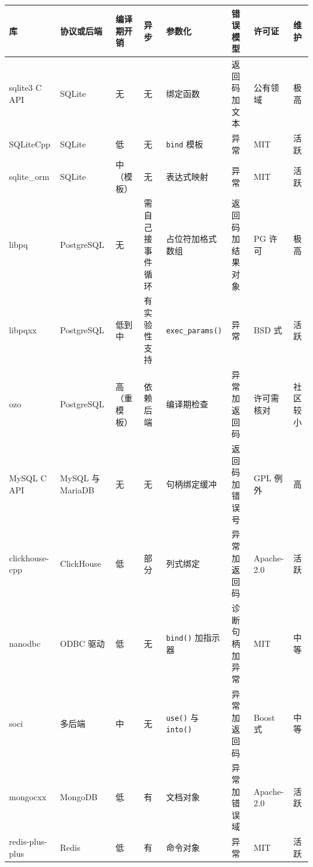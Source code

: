 \documentclass[12pt,a4paper,fontset=fandol]{ctexbook}
\newcommand{\Fn}[1]{\texttt{#1()}}
\newcommand{\Tp}[1]{\texttt{#1}}
\begin{document}
\begin{scriptsize}
\setlength{\tabcolsep}{3pt}
\begin{longtable}{@{}>{\raggedright\arraybackslash}p{}
                  >{\raggedright\arraybackslash}p{}
                  >{\raggedright\arraybackslash}p{}
                  >{\raggedright\arraybackslash}p{}
                  >{\raggedright\arraybackslash}p{}
                  >{\raggedright\arraybackslash}p{}
                  >{\raggedright\arraybackslash}p{}
                  >{\raggedright\arraybackslash}p{}@{}}
\toprule
\textbf{库} & \textbf{协议或后端} & \textbf{编译期开销} & \textbf{异步} &
\textbf{参数化} & \textbf{错误模型} & \textbf{许可证} &
\textbf{维护} \\
\midrule
sqlite3 C API & SQLite & 无 & 无 & 绑定函数 & 返回码加文本 &
公有领域 & 极高 \\
\addlinespace
SQLiteCpp & SQLite & 低 & 无 & \Tp{bind} 模板 & 异常 & MIT & 活跃 \\
\addlinespace
sqlite\_orm & SQLite & 中（模板） & 无 & 表达式映射 & 异常 & MIT & 活跃 \\
\addlinespace
libpq & PostgreSQL & 无 & 需自己接事件循环 & 占位符加格式数组 &
返回码加结果对象 & PG 许可 & 极高 \\
\addlinespace
libpqxx & PostgreSQL & 低到中 & 有实验性支持 & \Fn{exec\allowbreak \_params} &
异常 & BSD 式 & 活跃 \\
\addlinespace
ozo & PostgreSQL & 高（重模板） & 依赖后端 & 编译期检查 &
异常加返回码 & 许可需核对 & 社区较小 \\
\addlinespace
MySQL C API & MySQL 与 MariaDB & 无 & 无 & 句柄绑定缓冲 &
返回码加错误号 & GPL 例外 & 高 \\
\addlinespace
clickhouse-cpp & ClickHouse & 低 & 部分 & 列式绑定 & 异常加返回码 &
Apache-2.0 & 活跃 \\
\addlinespace
nanodbc & ODBC 驱动 & 低 & 无 & \Fn{bind} 加指示器 &
诊断句柄加异常 & MIT & 中等 \\
\addlinespace
soci & 多后端 & 中 & 无 & \Fn{use} 与 \Fn{into} &
异常加返回码 & Boost 式 & 中等 \\
\addlinespace
mongocxx & MongoDB & 低 & 有 & 文档对象 & 异常加错误域 & Apache-2.0 &
活跃 \\
\addlinespace
redis-plus-plus & Redis & 低 & 有 & 命令对象 & 异常 & MIT & 活跃 \\
\bottomrule
\end{longtable}
\setlength{\tabcolsep}{6pt}
\end{scriptsize}
\end{document}
